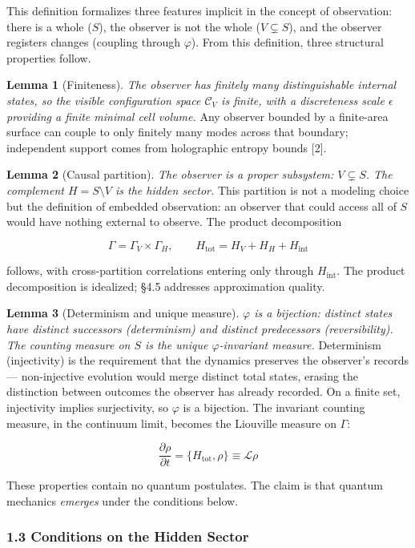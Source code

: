 \documentclass[
]{article}
\begin{document}
This definition formalizes three features implicit in the concept of
observation: there is a whole (\(S\)), the observer is not the whole
(\(V \subsetneq S\)), and the observer registers changes (coupling
through \(\varphi\)). From this definition, three structural properties
follow.

\textbf{Lemma 1} (Finiteness). \emph{The observer has finitely many
distinguishable internal states, so the visible configuration space
\(\mathcal{C}_V\) is finite, with a discreteness scale \(\epsilon\)
providing a finite minimal cell volume.} Any observer bounded by a
finite-area surface can couple to only finitely many modes across that
boundary; independent support comes from holographic entropy bounds
{[}2{]}.

\textbf{Lemma 2} (Causal partition). \emph{The observer is a proper
subsystem: \(V \subsetneq S\). The complement \(H = S \setminus V\) is
the hidden sector.} This partition is not a modeling choice but the
definition of embedded observation: an observer that could access all of
\(S\) would have nothing external to observe. The product decomposition

\[\Gamma = \Gamma_V \times \Gamma_H, \qquad H_{\text{tot}} = H_V + H_H + H_{\text{int}}\]

follows, with cross-partition correlations entering only through
\(H_{\text{int}}\). The product decomposition is idealized; §4.5
addresses approximation quality.

\textbf{Lemma 3} (Determinism and unique measure). \emph{\(\varphi\) is
a bijection: distinct states have distinct successors (determinism) and
distinct predecessors (reversibility). The counting measure on \(S\) is
the unique \(\varphi\)-invariant measure.} Determinism (injectivity) is
the requirement that the dynamics preserves the observer's records ---
non-injective evolution would merge distinct total states, erasing the
distinction between outcomes the observer has already recorded. On a
finite set, injectivity implies surjectivity, so \(\varphi\) is a
bijection. The invariant counting measure, in the continuum limit,
becomes the Liouville measure on \(\Gamma\):

\[\frac{\partial \rho}{\partial t} = \{H_{\text{tot}}, \rho\} \equiv \mathcal{L}\rho\]

These properties contain no quantum postulates. The claim is that
quantum mechanics \emph{emerges} under the conditions below.

\hypertarget{conditions-on-the-hidden-sector}{%
\subsubsection{1.3 Conditions on the Hidden
Sector}\label{conditions-on-the-hidden-sector}}
\end{document}
